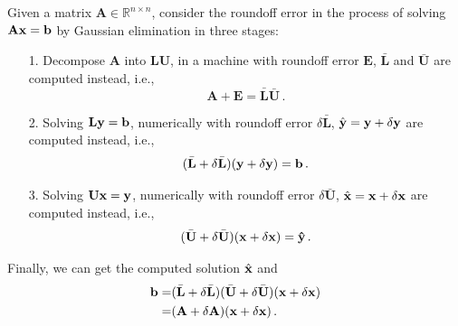 \documentclass[english,onecolumn]{IEEEtran}
\begin{document}
Given a matrix $\mathbf{A}\in \mathbb{R}^{n\times n}$, consider the roundoff error in the process of solving $\mathbf{A}\bf{x} = \bf{b}$ by Gaussian elimination in three stages:
\begin{enumerate}
    \item[1.] Decompose $\mathbf{A}$ into $\mathbf{L}\mathbf{U}$, in a machine with roundoff error $\mathbf{E}$, $\bar{\mathbf{L}}$ and $\bar{\mathbf{U}}$ are computed instead, i.e., 
    \begin{equation*}
        \mathbf{A} + \mathbf{E} = \bar{\mathbf{L}}\bar{\mathbf{U}}\,.
    \end{equation*}
    \item[2.] Solving $\mathbf{L}\bf{y} = \bf{b}$, numerically with roundoff error $\delta \mathbf{\bar{L}}$, $\hat{\mathbf{y}} = \bf{y}+\delta \bf{y}$ are computed instead, i.e.,
    \begin{equation*}
        (\bar{\mathbf{L}}+\delta \bar{\mathbf{L}})(\bf{y}+\delta \bf{y}) = \bf{b}\,.
    \end{equation*}
    \item[3.] Solving $\mathbf{U}\bf{x} = \bf{y}$, numerically with roundoff error $\delta \mathbf{\bar{U}}$, $\hat{\bf{x}} = \bf{x}+\delta \bf{x}$ are computed instead, i.e.,
    \begin{equation*}
        (\bar{\mathbf{U}}+\delta \bar{\mathbf{U}})(\bf{x}+\delta \bf{x}) = \hat{y}\,.
    \end{equation*}
\end{enumerate}
Finally, we can get the computed solution $\hat{\bf{x}}$ and 
\begin{align*}
    \bf{b} = &(\bar{\mathbf{L}}+\delta \bar{\mathbf{L}})(\bar{\mathbf{U}}+\delta \bar{\mathbf{U}})(\bf{x}+\delta \bf{x})\\
     = & (\mathbf{A}+\delta \mathbf{A})(\bf{\bf{x}}+\delta \bf{\bf{x}})\,.
\end{align*}
\end{document}
